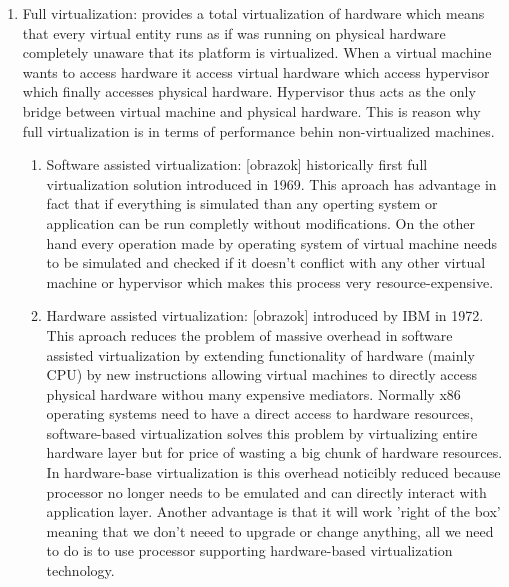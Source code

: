 \begin{enumerate}
\item Full virtualization:  provides a total virtualization of hardware which means that every virtual entity runs as if was running on physical hardware completely unaware that its platform is virtualized. When a virtual machine wants to access hardware it access virtual hardware which access hypervisor which finally accesses physical hardware. Hypervisor thus acts as the only bridge between virtual machine and physical hardware. This is reason why full virtualization is in terms of performance behin non-virtualized machines.
\begin{enumerate}
\item Software assisted virtualization: [obrazok] historically first full virtualization solution introduced in 1969. This aproach has advantage in fact that if everything is simulated than any operting system or application can be run completly without modifications. On the other hand every operation made by operating system of virtual machine needs to be simulated and checked if it doesn't conflict with any other virtual machine or hypervisor which makes this process very resource-expensive.
\item Hardware assisted virtualization: [obrazok] introduced by IBM in 1972. This aproach reduces the problem of massive overhead in software assisted virtualization by extending functionality of hardware (mainly CPU) by new instructions allowing virtual machines to directly access physical hardware withou many expensive mediators. Normally x86 operating systems need to have a direct access to hardware resources, software-based virtualization solves this problem by virtualizing entire hardware layer but for price of wasting a big chunk of hardware resources. In hardware-base virtualization is this overhead noticibly reduced because processor no longer needs to be emulated and can directly interact with application layer. Another advantage is that it will work 'right of the box' meaning that we don't neeed to upgrade or change anything, all we need to do is to use processor supporting hardware-based virtualization technology.
\end{enumerate}


\end{enumerate}
